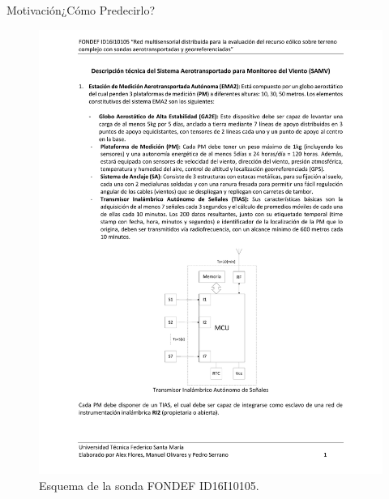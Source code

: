 \documentclass[mathserif]{beamer}
\begin{document}
\begin{frame}{Motivación}{¿Cómo Predecirlo?}
\begin{figure}[h]
\begin{minipage}{0.5\linewidth}
			\includegraphics[width=0.9\linewidth,page=5,trim={3cm 2.5cm 5cm 18.5cm},clip]{fig/01/descrp}
		\end{minipage}%
		\caption{Esquema de la sonda FONDEF ID16I10105.}
		\label{fig:01_sonda}
	\end{figure}
\end{frame}
\end{document}
